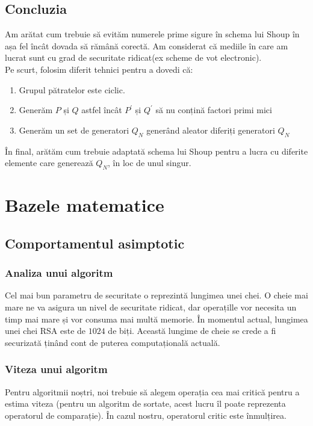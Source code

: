 \documentclass[12]{report}
\begin{document}
\subsection{Concluzia}
Am arătat cum trebuie să evităm numerele prime sigure în schema lui Shoup în așa fel încât dovada să rămână corectă. Am considerat că mediile în care am lucrat sunt cu grad de securitate ridicat(ex scheme de vot electronic).
\\ Pe scurt, folosim diferit tehnici pentru a dovedi că:
\begin{enumerate}
\item Grupul pătratelor este ciclic.

\item Generăm $P$ și $Q$ astfel încât $P^{'}$ și $Q^{'}$ să nu conțină factori primi mici

\item Generăm un set de generatori $Q_N$ generând aleator diferiți generatori $Q_N$
\end{enumerate} 
În final, arătăm cum trebuie adaptată schema lui Shoup pentru a lucra cu diferite elemente care generează $Q_N$, în loc de unul singur.


\section{Bazele matematice} 
    \subsection{Comportamentul asimptotic}
     \subsubsection{Analiza unui algoritm}
      Cel mai bun parametru de securitate o reprezintă lungimea unei chei. O cheie mai mare ne va
      asigura un nivel de securitate ridicat, dar operațille vor necesita un timp mai mare și vor consuma
      mai multă memorie. În momentul actual, lungimea unei chei RSA este de $1024$ de biți. Această lungime de 
      cheie se crede a fi securizată ținând cont de puterea computațională actuală.
     \subsubsection{Viteza unui algoritm}
      Pentru algoritmii noștri, noi trebuie să alegem operația cea mai critică pentru a estima viteza 
      (pentru un algoritm de sortate, acest lucru îl poate reprezenta operatorul de comparație). În cazul
      nostru, operatorul critic este înmulțirea. 
\end{document}
